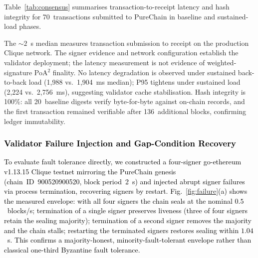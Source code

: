 \documentclass[conference]{IEEEtran}
\newcommand{\rev}[2]{#2}
\begin{document}
Table~\ref{tab:consensus} summarises \rev{R2.4}{transaction-to-receipt latency} and
hash integrity for 70~transactions submitted to PureChain
in baseline and sustained-load phases.

\begin{table}[!t]
\centering
\caption{\rev{R1.2, R2.4}{Production PureChain (Clique) transaction-to-receipt latency (ms)} and hash
integrity. \textcolor{black}{Active signer set recovered from
block-seal attribution; signer rotation observed (3 of 4 signers in recent blocks).}
Blocks~1{,}012{,}544--1{,}012{,}680.}
\label{tab:consensus}
\end{table}

\rev{R2.4}{The ${\sim}2$~s median measures transaction submission
to receipt on the production Clique network. The signer evidence
and network configuration establish the validator deployment;
the latency measurement is not evidence of weighted-signature
PoA$^2$ finality.}
No latency degradation is observed under sustained
back-to-back load (1{,}988 vs.\ 1{,}904~ms median);
P95 tightens under sustained load (2{,}224 vs.\
2{,}756~ms), suggesting validator cache stabilisation.
Hash integrity is 100\%: all 20~baseline digests verify
byte-for-byte against on-chain records, and the first
transaction remained verifiable after 136~additional
blocks, confirming ledger immutability.

\textcolor{black}{\subsubsection{Validator Failure Injection and Gap-Condition Recovery}
To evaluate fault tolerance directly, we constructed a
four-signer go-ethereum v1.13.15 Clique testnet mirroring
the PureChain genesis (chain~ID~900520900520, block
period~2~s) and injected abrupt signer failures via
process termination, recovering signers by restart.
Fig.~\ref{fig:failure}(a) shows the measured envelope:
with all four signers the chain seals at the nominal
$0.5$~blocks/s; termination of a single signer preserves
liveness (three of four signers retain the sealing
majority); termination of a second signer removes the
majority and the chain stalls; restarting the terminated
signers restores sealing within $1.04$~s. This confirms a
majority-honest, minority-fault-tolerant envelope
rather than classical one-third Byzantine fault tolerance.}
\end{document}
